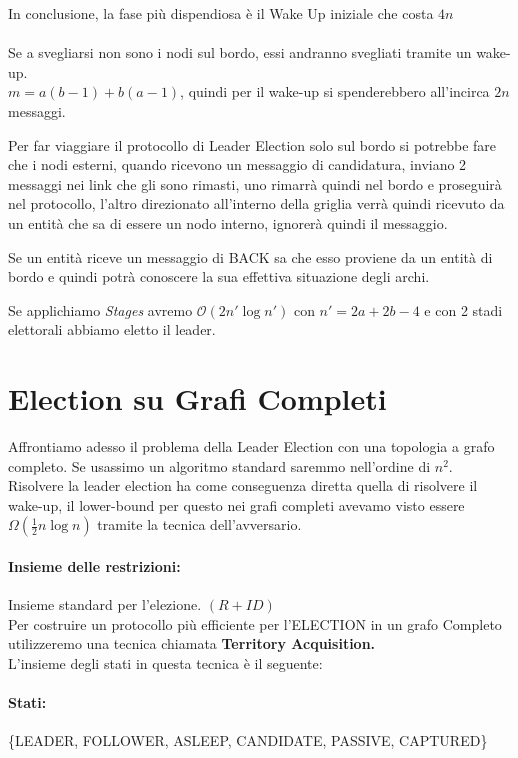 In conclusione, la fase più dispendiosa è il Wake Up iniziale che costa $4n$\\\\
Se a svegliarsi non sono i nodi sul bordo, essi andranno svegliati tramite un
wake-up.\\
$m = a(b-1) + b(a-1)$, quindi per il wake-up si spenderebbero all'incirca $2n$
messaggi.

Per far viaggiare il protocollo di Leader Election solo sul bordo si potrebbe
fare che i nodi esterni, quando ricevono un messaggio di candidatura, inviano 2
messaggi nei link che gli sono rimasti, uno rimarrà quindi nel bordo e proseguirà nel
protocollo, l'altro direzionato all'interno della griglia verrà quindi ricevuto
da un entità che sa di essere un nodo interno, ignorerà quindi il messaggio.

Se un entità riceve un messaggio di BACK sa che esso proviene da un entità di
bordo e quindi potrà conoscere la sua effettiva situazione degli archi.

Se applichiamo \emph{Stages} avremo $\mathcal{O}(2n' \log n')$ con $n' = 2a + 2b
    - 4$ e con 2 stadi elettorali abbiamo eletto il leader.

\section{Election su Grafi Completi}
Affrontiamo adesso il problema della Leader Election con una topologia a grafo
completo. Se usassimo un algoritmo standard saremmo nell'ordine di $n^2$.
Risolvere la leader election ha come conseguenza diretta quella di risolvere il
wake-up, il lower-bound per questo nei grafi completi avevamo visto essere
$\Omega(\frac{1}{2}n \log n)$ tramite la tecnica dell'avversario.

\paragraph{Insieme delle restrizioni:} Insieme standard per l'elezione. $(R+ID)$\\
Per costruire un protocollo più efficiente per l'ELECTION in un grafo Completo
utilizzeremo una tecnica chiamata \textbf{Territory Acquisition.}\\
L'insieme degli stati in questa tecnica è il seguente:

\paragraph{Stati:} \{LEADER, FOLLOWER, ASLEEP, CANDIDATE, PASSIVE, CAPTURED\}

